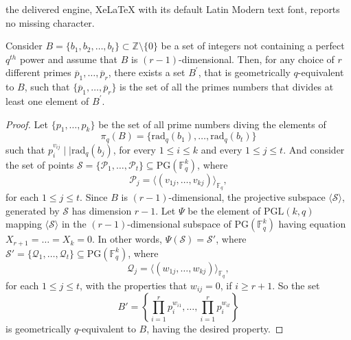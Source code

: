 \documentclass[10pt,a4paper]{amsart}
\newcommand{\F}{{\mathbb F}}
\newcommand{\PG}{\mathrm{PG}}
\newcommand{\Z}{{\mathbb Z}}
\newcommand{\rad}{\mathrm{rad}_q}
\begin{document}
the delivered engine, XeLaTeX with its default Latin Modern text font, reports no missing character.
\begin{proposition} \label{prop:reduceprimelength}
  Consider $B=\{b_1,b_2,\ldots,b_t\} \subset \Z \setminus \{0\}$ be a set of integers not containing a perfect $q^{th}$ power and assume that $B$ is $(r-1)$-dimensional. Then, for any choice of $r$ different primes $\overline{p}_1,\ldots,\overline{p}_r$, there exists a set $B^{\prime}$, that is geometrically $q$-equivalent to $B$, such that $\{\overline{p}_1,\ldots,\overline{p}_{r}\}$ is the set of all the primes numbers that divides at least one element of $B^{\prime}$.
\end{proposition}

\begin{proof}
Let $ \{p_1,\ldots,p_k\}$ be the set of all prime numbers diving the elements of \[\pi_q(B)=\{ 
    \rad( b_1 ),\ldots,\rad( b_t )
    \} \] such that $p_i^{v_{ij}} \mid \mid \rad( b_j )$, for every $1\leq i \leq k$ and every $1 \leq j \leq t$. 
 And consider the set of points $\mathcal{S}=\{\mathcal{P}_1,\ldots,\mathcal{P}_t\} \subseteq \PG(\F_{q}^{k})$, where 
        \[
        \mathcal{P}_j=\langle (v_{1j},\ldots,v_{kj}) \rangle_{\F_q}
        ,\]
        for each $1 \leq j \leq t$. Since $B$ is $(r-1)$-dimensional, the projective subspace $\langle \mathcal{S} \rangle$, generated by $\mathcal{S}$ has dimension $r-1$. Let $\Psi$ be the element of $\mathrm{PGL}(k,q)$ mapping $\langle \mathcal{S} \rangle$ in the $(r-1)$-dimensional subspace of $\PG(\F_{q}^{k})$ having equation $X_{r+1}=\ldots=X_k=0$. In other words, $\Psi(\mathcal{S})=\mathcal{S}'$, where $\mathcal{S}'=\{\mathcal{Q}_1,\ldots,\mathcal{Q}_t\} \subseteq \PG(\F_{q}^{k})$, where 
        \[
        \mathcal{Q}_j=\langle (w_{1j},\ldots,w_{kj}) \rangle_{\F_q}
        ,\]
        for each $1 \leq j \leq t$, with the properties that $w_{ij}=0$, if $i \geq r+1$. So the set \[
        B'=\left\{\prod_{i=1}^{r}p_i^{w_{i1}},\ldots,\prod_{i=1}^{r}p_i^{w_{it}}\right\}
        \]
        is geometrically $q$-equivalent to $B$, having the desired property.
\end{proof}
\end{document}

